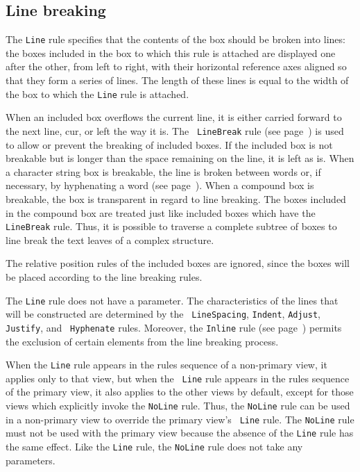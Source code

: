 \subsection{Line breaking}
\label{regleline}

The {\tt Line} rule specifies that the contents of the box should be
broken into lines: the boxes included in the box to which this rule is
attached are displayed one after the other, from left to right, with
their horizontal reference axes aligned so that they form a series of
lines.  The length of these lines is equal to the width of the box to
which the {\tt Line} rule is attached.

When an included box overflows the current line, it is either carried
forward to the next line, cur, or left the way it is.  The {\tt
LineBreak} rule (see page~\pageref{condcoupure}) is used to allow or
prevent the breaking of included boxes.  If the included box is not
breakable but is longer than the space remaining on the line, it is
left as is.  When a character string box is breakable, the line is
broken between words or, if necessary, by hyphenating a word (see
page~\pageref{reglehyphenate}).  When a compound box is breakable, the
box is transparent in regard to line breaking.  The boxes included in
the compound box are treated just like included boxes which have the
{\tt LineBreak} rule.  Thus, it is possible to traverse a complete
subtree of boxes to line break the text leaves of a complex structure.

The relative position rules of the included boxes are ignored, since the
boxes will be placed according to the line breaking rules.

The {\tt Line} rule does not have a parameter.  The characteristics of
the lines that will be constructed are determined by the {\tt
LineSpacing}, {\tt Indent}, {\tt Adjust}, {\tt Justify}, and {\tt
Hyphenate} rules.  Moreover, the {\tt Inline} rule (see
page~\pageref{regleinline}) permits the exclusion of certain elements
from the line breaking process.

When the {\tt Line} rule appears in the rules sequence of a
non-primary view, it applies only to that view, but when the {\tt
Line} rule appears in the rules sequence of the primary view, it also
applies to the other views by default, except for those views which
explicitly invoke the {\tt NoLine} rule.  Thus, the {\tt NoLine} rule
can be used in a non-primary view to override the primary view's {\tt
Line} rule.  The {\tt NoLine} rule must not be used with the primary
view because the absence of the {\tt Line} rule has the same effect.
Like the {\tt Line} rule, the {\tt NoLine} rule does not take any
parameters.


